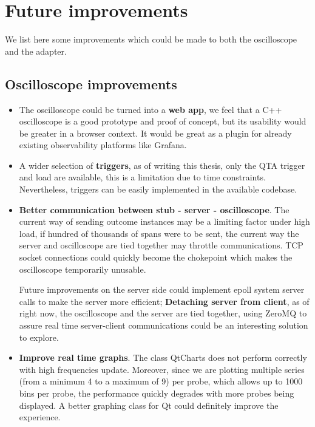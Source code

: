     \section{Future improvements}
     We list here some improvements which could be made to both the oscilloscope and the adapter.
        \subsection{Oscilloscope improvements}
           \begin{itemize}
            
                \item The oscilloscope could be turned into a \textbf{web app}, we feel that a C++ oscilloscope is a good prototype and proof of concept, but its usability would be greater in a browser context. It would be great as a plugin for already existing observability platforms like Grafana.
            
                \item A wider selection of \textbf{triggers}, as of writing this thesis, only the QTA trigger and load are available, this is a limitation due to time constraints. Nevertheless, triggers can be easily implemented in the available codebase.
            
                \item \textbf{Better communication between stub - server - oscilloscope}. The current way of sending outcome instances may be a limiting factor under high load, if hundred of thousands of spans were to be sent, the current way the server and oscilloscope are tied together may throttle communications. TCP socket connections could quickly become the chokepoint which makes the oscilloscope temporarily unusable.

            Future improvements on the server side could implement epoll system server calls to make the server more efficient; \textbf{Detaching server from client}, as of right now, the oscilloscope and the server are tied together, using ZeroMQ to assure real time server-client communications could be an interesting solution to explore.

                \item \textbf{Improve real time graphs}. The class QtCharts does not perform correctly with high frequencies update. Moreover, since we are plotting multiple series (from a minimum 4 to a maximum of 9) per probe, which allows up to 1000 bins per probe, the performance quickly degrades with more probes being displayed. A better graphing class for Qt could definitely improve the experience.


\end{itemize}
